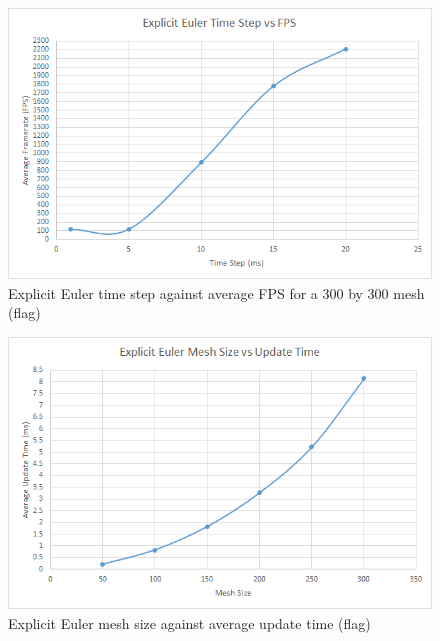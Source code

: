     \begin{figure}
    \begin{center}
      \includegraphics[scale=.9]{Figures/flag_ee_ts_fps}
    \end{center}
    \caption{Explicit Euler time step against average FPS for a 300 by 300 mesh (flag)}
    \label{fig:ee step fps flag}
  \end{figure}
  
    \begin{figure}
    \begin{center}
      \includegraphics[scale=.9]{Figures/flag_ee_m_ut}
    \end{center}
    \caption{Explicit Euler mesh size against average update time (flag)}
    \label{fig:ee mesh update flag}
  \end{figure}
  
